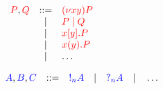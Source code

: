 \documentclass[multi=page,crop]{standalone}
\begin{document}
\clearpage
\begin{page}
  \(
  \begin{array}{lcl}
    \tm{P}, \tm{Q} & ::=  & \tm{\piNew{xy}{P}}    \\
                   & \mid & \tm{\piPar{P}{Q}}     \\
                   & \mid & \tm{\piSend{x}{y}{P}} \\
                   & \mid & \tm{\piRecv{x}{y}{P}} \\
                   & \mid & \dots
  \end{array}
  \)
\end{page}
\clearpage
\begin{page}
  \(
  \ty{A}, \ty{B}, \ty{C}
  \quad{::=}\quad
  \ty{\take[n]{A}}
  \quad{\mid}\quad
  \ty{\give[n]{A}}
  \quad{\mid}\quad
  \dots
  \)
\end{page}
\clearpage
\begin{page}
  \begin{prooftree*}
    \SYM{(\take[1]{})}
  \end{prooftree*}
\end{page}
\clearpage
\begin{page}
  \begin{prooftree*}
    \SYM{(\give[1]{})}
  \end{prooftree*}
\end{page}
\clearpage
\begin{page}
  \begin{prooftree*}
  \end{prooftree*}
\end{page}
\clearpage
\begin{page}
  \begin{prooftree*}
  \end{prooftree*}
\end{page}
\end{document}
